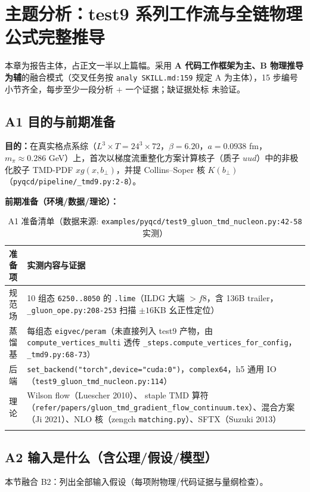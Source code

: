 \documentclass[UTF8]{ctexart}
\begin{document}
\section{主题分析：test9 系列工作流与全链物理公式完整推导}
\label{sec:topic}
本章为报告主体，占正文一半以上篇幅。采用 \textbf{A 代码工作框架为主、B 物理推导为辅}的融合模式（交叉任务按 \texttt{\nolinkurl{analy SKILL.md:159}} 规定 A 为主体），15 步编号小节齐全，每步至少一段分析 $+$ 一个证据；缺证据处标 \textcolor{warn}{未验证}。

\subsection{A1 目的与前期准备}
\textbf{目的：}在真实格点系综（$L^3\times T=24^3\times72$，$\beta=6.20$，$a=0.0938$ fm，$m_\pi\approx0.286$ GeV）上，首次以梯度流重整化方案计算核子（质子 $uud$）中的非极化胶子 TMD-PDF $xg(x,b_\perp)$，并提 Collins--Soper 核 $K(b_\perp)$（\texttt{\nolinkurl{pyqcd/pipeline/\_tmd9.py:2-8}}）。

\textbf{前期准备（环境/数据/理论）：}
\small
\begin{xltabular}{\textwidth}{lX}
\toprule
准备项 & 实测内容与证据 \\
\midrule
\endhead
规范场 & 10 组态 \texttt{\nolinkurl{6250..8050}} 的 \texttt{\nolinkurl{.lime}}（ILDG 大端 $>f8$，含 136B trailer，\texttt{\nolinkurl{\_gluon\_ope.py:208-253}} 扫描 $ \pm16$KB 幺正性定位） \\
蒸馏基 & 每组态 \texttt{\nolinkurl{eigvec/peram}}（未直接列入 test9 产物，由 \texttt{\nolinkurl{compute\_vertices\_multi}} 透传 \texttt{\nolinkurl{\_steps.compute\_vertices\_for\_config}}，\texttt{\nolinkurl{\_tmd9.py:68-73}}） \\
后端 & \texttt{\nolinkurl{set\_backend("torch",device="cuda:0")}}，\texttt{\nolinkurl{complex64}}，h5 通用 IO（\texttt{\nolinkurl{test9\_gluon\_tmd\_nucleon.py:114}}） \\
理论 & Wilson flow（Luescher 2010）、 staple TMD 算符（\texttt{\nolinkurl{refer/papers/gluon\_tmd\_gradient\_flow\_continuum.tex}}）、混合方案（Ji 2021）、NLO 核（zengch \texttt{\nolinkurl{matching.py}}）、SFTX（Suzuki 2013） \\
\bottomrule
\caption{A1 准备清单（数据来源: \texttt{\nolinkurl{examples/pyqcd/test9\_gluon\_tmd\_nucleon.py:42-58}} 实测）}
\end{xltabular}

\subsection{A2 输入是什么（含公理/假设/模型）}
\label{sec:a2}
本节融合 B2：列出全部输入假设（每项附物理/代码证据与量纲检查）。
\end{document}
